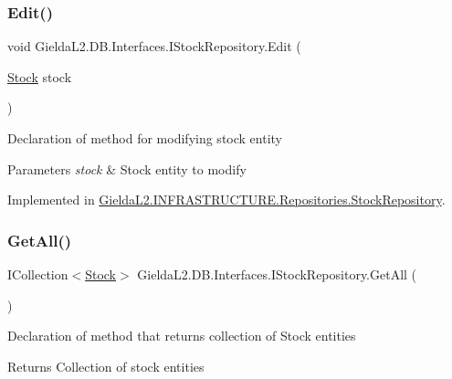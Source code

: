 \subsubsection{\texorpdfstring{Edit()}{Edit()}}
{\footnotesize\ttfamily void Gielda\+L2.\+D\+B.\+Interfaces.\+I\+Stock\+Repository.\+Edit (\begin{DoxyParamCaption}\item[{\mbox{\hyperlink{class_gielda_l2_1_1_d_b_1_1_entities_1_1_stock}{Stock}}}]{stock }\end{DoxyParamCaption})}



Declaration of method for modifying stock entity 


\begin{DoxyParams}{Parameters}
{\em stock} & Stock entity to modify\\
\hline
\end{DoxyParams}


Implemented in \mbox{\hyperlink{class_gielda_l2_1_1_i_n_f_r_a_s_t_r_u_c_t_u_r_e_1_1_repositories_1_1_stock_repository_aaf7203a96523df7f04c2a0a8fde5b1fe}{Gielda\+L2.\+I\+N\+F\+R\+A\+S\+T\+R\+U\+C\+T\+U\+R\+E.\+Repositories.\+Stock\+Repository}}.

\mbox{\label{interface_gielda_l2_1_1_d_b_1_1_interfaces_1_1_i_stock_repository_a038d11f6dd79d0b6361e16137a16f1f7}} 
\subsubsection{\texorpdfstring{GetAll()}{GetAll()}}
{\footnotesize\ttfamily I\+Collection$<$\mbox{\hyperlink{class_gielda_l2_1_1_d_b_1_1_entities_1_1_stock}{Stock}}$>$ Gielda\+L2.\+D\+B.\+Interfaces.\+I\+Stock\+Repository.\+Get\+All (\begin{DoxyParamCaption}{ }\end{DoxyParamCaption})}



Declaration of method that returns collection of Stock entities 

\begin{DoxyReturn}{Returns}
Collection of stock entities
\end{DoxyReturn}


